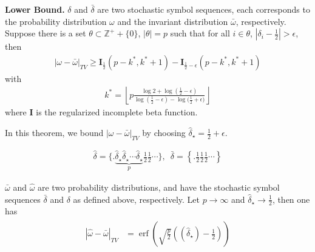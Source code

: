 \documentclass[12pt,t]{beamer}
\DeclareMathOperator{\erf}{erf} \DeclareMathOperator{\prob}{Prob}
\begin{document}
\begin{frame}
\begin{theorem}\textbf{Lower Bound.}
\label{theoremlb}
$\delta$ and $\bar{\delta}$ are two stochastic symbol sequences, each corresponds to the probability distribution $\omega$ and the invariant distribution $\bar{\omega}$, respectively. Suppose there is a set $\theta \subset \mathbb{Z}^++\{0\} $, $|\theta|=p$ such that for all $i \in \theta$, $|\delta_i-\frac{1}{2}|>\epsilon$, then
\begin{eqnarray}
\label{lbineq}
|\omega-\bar{\omega}|_{TV} \ge \mathbf{I}_{\frac{1}{2}}(p-k^*,k^*+1) - \mathbf{I}_{\frac{1}{2}-\epsilon}(p-k^*,k^*+1)
\end{eqnarray}
with
\begin{eqnarray}
\label{kstar}
k^* =  \left\lfloor p \frac{\log{2}+\log{(\frac{1}{2}-\epsilon)} }{\log{(\frac{1}{2}-\epsilon)}-\log{(\frac{1}{2}+\epsilon})} \right\rfloor
\end{eqnarray}
where $\mathbf{I}$ is the regularized incomplete beta function.
\end{theorem}
In this theorem, we bound $|\omega-\bar{\omega}|_{TV}$ by choosing $\hat{\delta}_\star = \frac{1}{2}+\epsilon$. 

\end{frame}

\begin{frame}
         \begin{align*}
         \hat{\delta}      = \{.\underbrace{\hat{\delta}_\star \hat{\delta}_\star \cdots \hat{\delta}_\star}_{p}\frac{1}{2}\frac{1}{2}\cdots\}, \,\,\,
         \bar{\delta}  = \left\{.\frac{1}{2}\frac{1}{2}\frac{1}{2}\cdots\right\}
         \end{align*}
\begin{theorem}
\label{theoremapproxlb} $\bar{\omega}$ and $\hat{\omega}$ are two probability distributions, and have the stochastic
symbol sequences $\bar{\delta}$ and $\delta$ as defined above, respectively. Let $p
\rightarrow \infty$ and $\hat{\delta}_{\star} \rightarrow \frac{1}{2}$, then one has
\begin{align}
\begin{split}
  \label{lbublimit}
                 |\hat{\omega}-\bar{\omega}|_{TV}
               & =  \erf \left( \sqrt{\frac{p}{2}}\left((\hat{\delta}_{\star})-\frac{1}{2}\right)\right)
\end{split}
\end{align}


\end{theorem}

\end{frame}
\end{document}
